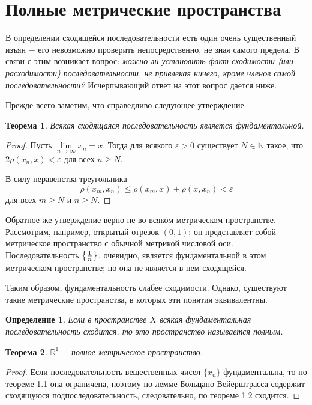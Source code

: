\documentclass{article}
\newtheorem{theorem}{Теорема}[section]
\newtheorem{definition}{Определение}[section]
\begin{document}
\section{Полные метрические пространства}

В определении сходящейся последовательности есть один очень существенный изъян \(-\) его невозможно проверить непосредственно, не зная самого предела. В  связи  с  этим  возникает  вопрос:  \textit{можно  ли  установить  факт сходимости (или расходимости) последовательности,  не  привлекая ничего, кроме членов самой последовательности?} Исчерпывающий ответ на этот вопрос дается ниже.

Прежде всего заметим, что справедливо следующее утверждение.

\begin{theorem}
Всякая сходящаяся последовательность является фундаментальной.
\end{theorem}

\begin{proof}
Пусть \(\lim\limits_{n \to \infty} {x_n} = x\). Тогда для всякого \(\varepsilon > 0\) существует \(N \in \mathbb{N}\) такое, что \(2\rho(x_n, x) < \varepsilon\) для всех \(n \geq N\).

В силу неравенства треугольника
\[
\rho(x_m, x_n) \leq \rho(x_m, x) + \rho(x, x_n) < \varepsilon
\]
для всех \(m \geq N\) и \(n \geq N\).
\end{proof}

Обратное же утверждение верно не во всяком метрическом пространстве. Рассмотрим, например, открытый отрезок \((0, 1)\); он представляет собой метрическое пространство с обычной метрикой числовой оси. Последовательность
\(
\left\lbrace 1 \over n\right\rbrace
\),
очевидно, является фундаментальной в этом метрическом пространстве; но она не является в нем сходящейся.

Таким образом, фундаментальность слабее сходимости. Однако, существуют такие метрические пространства, в которых эти понятия эквивалентны.

\begin{definition}
Если в пространстве \(X\) всякая фундаментальная последовательность сходится, то это пространство называется полным.
\end{definition}

\begin{theorem}
\(\mathbb{R} ^ 1\) \(-\) полное метрическое пространство.
\end{theorem}

\begin{proof}
Если последовательность вещественных чисел \(\{x_n\}\) фундаментальна, то по теореме 1.1 она ограничена, поэтому по лемме Больцано-Вейерштрасса содержит сходящуюся подпоследовательность, следовательно, по теореме 1.2 сходится.
\end{proof}
\end{document}
